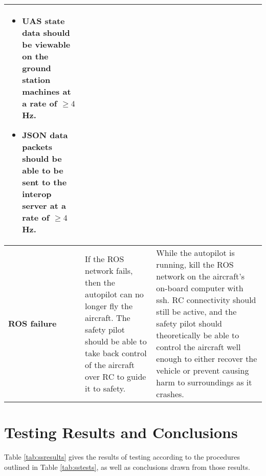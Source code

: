 \documentclass[]{auvsi_doc}
\begin{document}
\begin{center}
\begin{longtable}[H]{|P{3cm}|P{5.75cm}|P{5.75cm}|}
\begin{itemize}
			\item UAS state data should be viewable on the ground station machines at a rate of  $\geq 4$ Hz.
			\item JSON data packets should be able to be sent to the interop server at a rate of $\geq 4$ Hz.
		\end{itemize} \\
		\hline
		\textbf{ROS failure}	& If the ROS network fails, then the autopilot can no longer fly the aircraft. The safety pilot should be able to take back control of the aircraft over RC to guide it to safety. &	While the autopilot is running, kill the ROS network on the aircraft's on-board computer with ssh. RC connectivity should still be active, and the safety pilot should theoretically be able to control the aircraft well enough to either recover the vehicle or prevent causing harm to surroundings as it crashes. \\
		\hline
	\end{longtable}
\end{center}

\section{Testing Results and Conclusions}

Table \ref{tab:ssresults} gives the results of testing according to the procedures outlined in Table \ref{tab:sstests}, as well as conclusions drawn from those results.
\end{document}
